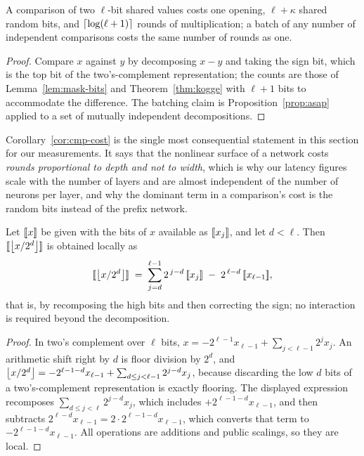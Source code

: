 \begin{corolary}
\label{cor:cmp-cost}
A comparison of two $\ell$-bit shared values costs one opening, $\ell+\kappa$
shared random bits, and $\left\lceil \log(\ell+1) \right\rceil$ rounds of multiplication; a batch
of any number of independent comparisons costs the same number of rounds as one.
\end{corolary}

\begin{proof}
Compare $x$ against $y$ by decomposing $x-y$ and taking the sign bit, which is
the top bit of the two's-complement representation; the counts are those of
Lemma~\ref{lem:mask-bits} and Theorem~\ref{thm:kogge} with $\ell+1$ bits to
accommodate the difference. The batching claim is Proposition~\ref{prop:asap}
applied to a set of mutually independent decompositions.
\end{proof}

Corollary~\ref{cor:cmp-cost} is the single most consequential statement in this
section for our measurements. It says that the nonlinear surface of a network
costs \emph{rounds proportional to depth and not to width}, which is why our
latency figures scale with the number of layers and are almost independent of the
number of neurons per layer, and why the dominant term in a comparison's cost is
the random bits instead of the prefix network.

\begin{proposition}[Truncation]
\label{prop:trunc}
Let $[\![x]\!]$ be given with the bits of $x$ available as $[\![x_j]\!]$, and let
$d < \ell$. Then $[\![\left\lfloor x/2^{d} \right\rfloor]\!]$ is obtained locally as
\[
  [\![\left\lfloor x/2^{d} \right\rfloor]\!] \;=\; \sum_{j=d}^{\ell-1} 2^{\,j-d}\,[\![x_j]\!]
  \;-\; 2^{\,\ell-d}\,[\![x_{\ell-1}]\!] ,
\]
that is, by recomposing the high bits and then correcting the sign; no
interaction is required beyond the decomposition.
\end{proposition}

\begin{proof}
In two's complement over $\ell$ bits,
$x = -2^{\ell-1}x_{\ell-1} + \sum_{j<\ell-1}2^j x_j$. An arithmetic shift right by
$d$ is floor division by $2^d$, and
$\left\lfloor x/2^d \right\rfloor = -2^{\ell-1-d}x_{\ell-1} + \sum_{d \le j < \ell-1} 2^{j-d}x_j$,
because discarding the low $d$ bits of a two's-complement representation is
exactly flooring. The displayed expression recomposes
$\sum_{d \le j < \ell} 2^{j-d} x_j$, which includes $+2^{\ell-1-d}x_{\ell-1}$,
and then subtracts $2^{\ell-d} x_{\ell-1} = 2\cdot 2^{\ell-1-d}x_{\ell-1}$, which
converts that term to $-2^{\ell-1-d}x_{\ell-1}$. All operations are additions and public scalings, so
they are local.
\end{proof}

